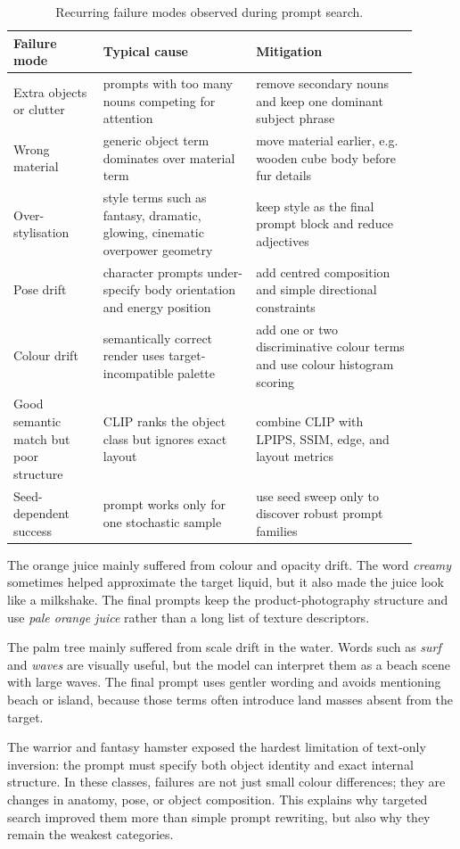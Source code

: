 \documentclass[runningheads]{llncs}
\begin{document}
\begin{table}[H]
\centering
\caption{Recurring failure modes observed during prompt search.}
\label{tab:failures}
\footnotesize
\begin{tabular}{p{0.20\linewidth}p{0.34\linewidth}p{0.36\linewidth}}
\toprule
Failure mode & Typical cause & Mitigation \\
\midrule
Extra objects or clutter & prompts with too many nouns competing for attention & remove secondary nouns and keep one dominant subject phrase \\
Wrong material & generic object term dominates over material term & move material earlier, e.g. wooden cube body before fur details \\
Over-stylisation & style terms such as fantasy, dramatic, glowing, cinematic overpower geometry & keep style as the final prompt block and reduce adjectives \\
Pose drift & character prompts under-specify body orientation and energy position & add centred composition and simple directional constraints \\
Colour drift & semantically correct render uses target-incompatible palette & add one or two discriminative colour terms and use colour histogram scoring \\
Good semantic match but poor structure & CLIP ranks the object class but ignores exact layout & combine CLIP with LPIPS, SSIM, edge, and layout metrics \\
Seed-dependent success & prompt works only for one stochastic sample & use seed sweep only to discover robust prompt families \\
\bottomrule
\end{tabular}
\end{table}

The orange juice mainly suffered from colour and opacity drift. The word \emph{creamy} sometimes helped approximate the target liquid, but it also made the juice look like a milkshake. The final prompts keep the product-photography structure and use \emph{pale orange juice} rather than a long list of texture descriptors.

The palm tree mainly suffered from scale drift in the water. Words such as \emph{surf} and \emph{waves} are visually useful, but the model can interpret them as a beach scene with large waves. The final prompt uses gentler wording and avoids mentioning beach or island, because those terms often introduce land masses absent from the target.

The warrior and fantasy hamster exposed the hardest limitation of text-only inversion: the prompt must specify both object identity and exact internal structure. In these classes, failures are not just small colour differences; they are changes in anatomy, pose, or object composition. This explains why targeted search improved them more than simple prompt rewriting, but also why they remain the weakest categories.
\end{document}
